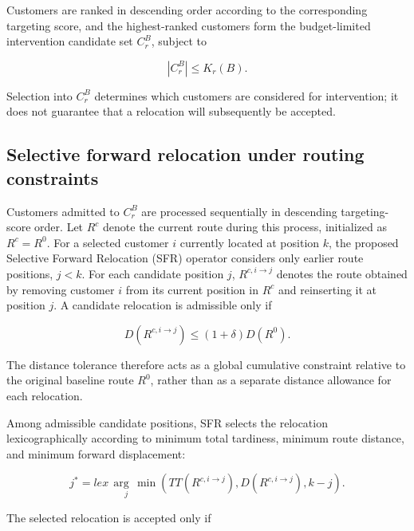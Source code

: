 \documentclass[11pt,a4paper]{article}
\begin{document}
Customers are ranked in descending order according to the corresponding
targeting score, and the highest-ranked customers form the
budget-limited intervention candidate set \(C_{r}^{B}\), subject to

\begin{equation}
\left| C_{r}^{B} \right| \leq K_{r}(B).
\label{eq:14}
\end{equation}

Selection into \(C_{r}^{B}\) determines which customers are considered
for intervention; it does not guarantee that a relocation will
subsequently be accepted.

\subsection{Selective forward relocation under routing constraints}\label{sec:sfr}

Customers admitted to \(C_{r}^{B}\) are processed sequentially in
descending targeting-score order. Let \(R^{c}\) denote the current route
during this process, initialized as \(R^{c} = R^{0}\). For a selected
customer \(i\) currently located at position \(k\), the proposed
Selective Forward Relocation (SFR) operator considers only earlier route
positions, \(j < k\). For each candidate position \(j\),
\(R^{c,i \rightarrow j}\) denotes the route obtained by removing
customer \(i\) from its current position in \(R^{c}\) and reinserting it
at position \(j\). A candidate relocation is admissible only if

\begin{equation}
D\left( R^{c,i \rightarrow j} \right) \leq (1 + \delta)D\left( R^{0} \right).
\label{eq:15}
\end{equation}

The distance tolerance therefore acts as a global cumulative constraint
relative to the original baseline route \(R^{0}\), rather than as a
separate distance allowance for each relocation.

Among admissible candidate positions, SFR selects the relocation
lexicographically according to minimum total tardiness, minimum route
distance, and minimum forward displacement:

\begin{equation}
j^{*} = \underset{j}{lex\,\arg\,\min}(TT\left( R^{c,i \rightarrow j} \right),D\left( R^{c,i \rightarrow j} \right),k - j).
\label{eq:16}
\end{equation}

The selected relocation is accepted only if
\end{document}

